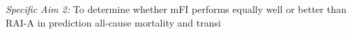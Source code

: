\emph{Specific Aim 2:} To determine whether mFI performs equally well or better than RAI-A in prediction all-cause mortality and transi